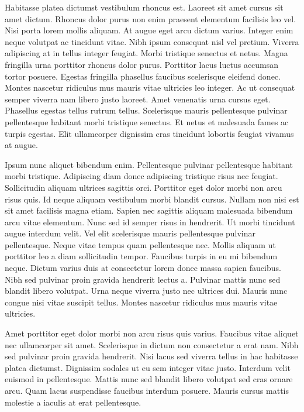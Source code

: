 \documentclass[11pt,a4paper]{article}
\begin{document}
Habitasse platea dictumst vestibulum rhoncus est. Laoreet sit amet cursus sit amet dictum. Rhoncus dolor purus non enim praesent elementum facilisis leo vel. Nisi porta lorem mollis aliquam. At augue eget arcu dictum varius. Integer enim neque volutpat ac tincidunt vitae. Nibh ipsum consequat nisl vel pretium. Viverra adipiscing at in tellus integer feugiat. Morbi tristique senectus et netus. Magna fringilla urna porttitor rhoncus dolor purus. Porttitor lacus luctus accumsan tortor posuere. Egestas fringilla phasellus faucibus scelerisque eleifend donec. Montes nascetur ridiculus mus mauris vitae ultricies leo integer. Ac ut consequat semper viverra nam libero justo laoreet. Amet venenatis urna cursus eget. Phasellus egestas tellus rutrum tellus. Scelerisque mauris pellentesque pulvinar pellentesque habitant morbi tristique senectus. Et netus et malesuada fames ac turpis egestas. Elit ullamcorper dignissim cras tincidunt lobortis feugiat vivamus at augue.

Ipsum nunc aliquet bibendum enim. Pellentesque pulvinar pellentesque habitant morbi tristique. Adipiscing diam donec adipiscing tristique risus nec feugiat. Sollicitudin aliquam ultrices sagittis orci. Porttitor eget dolor morbi non arcu risus quis. Id neque aliquam vestibulum morbi blandit cursus. Nullam non nisi est sit amet facilisis magna etiam. Sapien nec sagittis aliquam malesuada bibendum arcu vitae elementum. Nunc sed id semper risus in hendrerit. Ut morbi tincidunt augue interdum velit. Vel elit scelerisque mauris pellentesque pulvinar pellentesque. Neque vitae tempus quam pellentesque nec. Mollis aliquam ut porttitor leo a diam sollicitudin tempor. Faucibus turpis in eu mi bibendum neque. Dictum varius duis at consectetur lorem donec massa sapien faucibus. Nibh sed pulvinar proin gravida hendrerit lectus a. Pulvinar mattis nunc sed blandit libero volutpat. Urna neque viverra justo nec ultrices dui. Mauris nunc congue nisi vitae suscipit tellus. Montes nascetur ridiculus mus mauris vitae ultricies.

Amet porttitor eget dolor morbi non arcu risus quis varius. Faucibus vitae aliquet nec ullamcorper sit amet. Scelerisque in dictum non consectetur a erat nam. Nibh sed pulvinar proin gravida hendrerit. Nisi lacus sed viverra tellus in hac habitasse platea dictumst. Dignissim sodales ut eu sem integer vitae justo. Interdum velit euismod in pellentesque. Mattis nunc sed blandit libero volutpat sed cras ornare arcu. Quam lacus suspendisse faucibus interdum posuere. Mauris cursus mattis molestie a iaculis at erat pellentesque.
\end{document}
